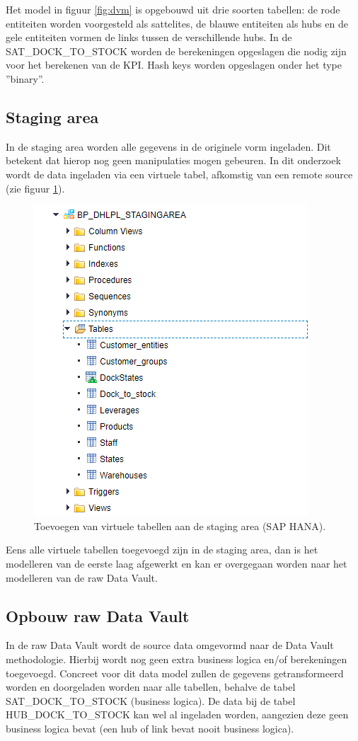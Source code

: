 Het model in figuur \ref{fig:dvm} is opgebouwd uit drie soorten tabellen: de rode entiteiten worden voorgesteld als sattelites, de blauwe entiteiten als hubs en de gele entiteiten vormen de links tussen de verschillende hubs. In de SAT\_DOCK\_TO\_STOCK worden de berekeningen opgeslagen die nodig zijn voor het berekenen van de KPI. Hash keys worden opgeslagen onder het type ''binary''.

\subsection{Staging area}
\label{sec:stagareadv}
In de staging area worden alle gegevens in de originele vorm ingeladen. Dit betekent dat hierop nog geen manipulaties mogen gebeuren. In dit onderzoek wordt de data ingeladen via een virtuele tabel, afkomstig van een remote source (zie figuur \ref{fig:stag}).

\begin{figure}[h]
	\centering
	\includegraphics[scale=0.45]{../images/DV_staging.png}
	\caption{Toevoegen van virtuele tabellen aan de staging area (SAP HANA).}
	\label{fig:stag}
\end{figure}

Eens alle virtuele tabellen toegevoegd zijn in de staging area, dan is het modelleren van de eerste laag afgewerkt en kan er overgegaan worden naar het modelleren van de raw Data Vault.

\subsection{Opbouw raw Data Vault}
In de raw Data Vault wordt de source data omgevormd naar de Data Vault methodologie. Hierbij wordt nog geen extra business logica en/of berekeningen toegevoegd. Concreet voor dit data model zullen de gegevens getransformeerd worden en doorgeladen worden naar alle tabellen, behalve de tabel SAT\_DOCK\_TO\_STOCK (business logica). De data bij de tabel HUB\_DOCK\_TO\_STOCK kan wel al ingeladen worden, aangezien deze geen business logica bevat (een hub of link bevat nooit business logica).

